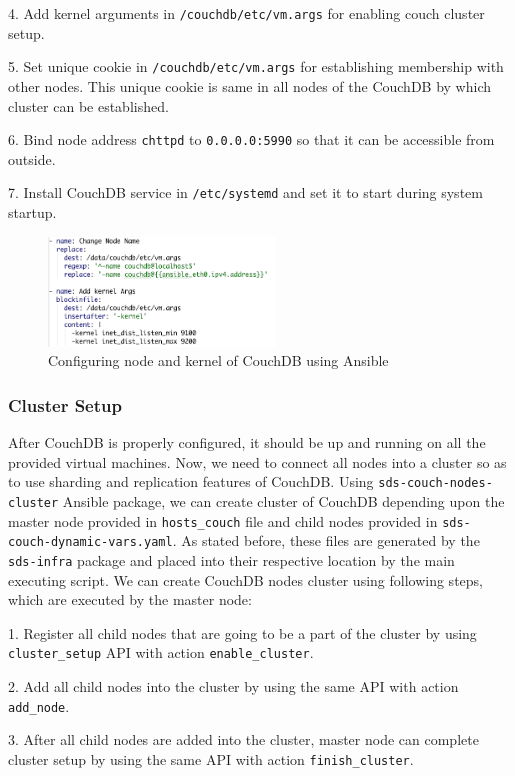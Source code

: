 4. Add kernel arguments in \texttt{/couchdb/etc/vm.args} for enabling couch cluster setup.

5. Set unique cookie in \texttt{/couchdb/etc/vm.args} for establishing membership with other nodes. This unique cookie is same in all nodes of the CouchDB by which cluster can be established.

6. Bind node address \texttt{chttpd} to \texttt{0.0.0.0:5990} so that it can be accessible from outside.

7. Install CouchDB service in \texttt{/etc/systemd} and set it to start during system startup.

\begin{figure}[H]
    \centering
    \includegraphics[width=6cm,keepaspectratio=true]{images/deployment/couchdb_config.png}
    \caption{Configuring node and kernel of CouchDB using Ansible}
    \label{fig:couchinstallation2}
\end{figure}

\subsubsection{Cluster Setup}
After CouchDB is properly configured, it should be up and running on all the provided virtual machines. Now, we need to connect all nodes into a cluster so as to use sharding and replication features of CouchDB. Using \texttt{sds-couch-nodes-cluster} Ansible package, we can create cluster of CouchDB depending upon the master node provided in \texttt{hosts\_couch} file and child nodes provided in \texttt{sds-couch-dynamic-vars.yaml}. As stated before, these files are generated by the \texttt{sds-infra} package and placed into their respective location by the main executing script. We can create CouchDB nodes cluster using following steps, which are executed by the master node:

1. Register all child nodes that are going to be a part of the cluster by using \texttt{cluster\_setup} API with action \texttt{enable\_cluster}.

2. Add all child nodes into the cluster by using the same API with action \texttt{add\_node}.

3. After all child nodes are added into the cluster, master node can complete cluster setup by using the same API with action \texttt{finish\_cluster}.

